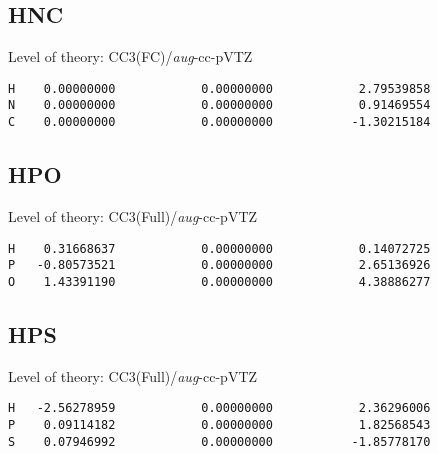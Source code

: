 \documentclass[journal=jctcce,manuscript=article,layout=traditional]{achemso}
\newcommand{\AVTZ}{\emph{aug}-cc-pVTZ}
\begin{document}

\subsection*{HNC}

\begin{singlespace}
Level of theory: CC3(FC)/{\AVTZ}
\begin{verbatim}
H    0.00000000            0.00000000            2.79539858
N    0.00000000            0.00000000            0.91469554
C    0.00000000            0.00000000           -1.30215184
\end{verbatim}
\end{singlespace}

\subsection*{HPO}

\begin{singlespace}
Level of theory: CC3(Full)/{\AVTZ}
\begin{verbatim}
H    0.31668637            0.00000000            0.14072725
P   -0.80573521            0.00000000            2.65136926
O    1.43391190            0.00000000            4.38886277
\end{verbatim}
\end{singlespace}

\subsection*{HPS}

\begin{singlespace}
Level of theory: CC3(Full)/{\AVTZ}
\begin{verbatim}
H   -2.56278959            0.00000000            2.36296006
P    0.09114182            0.00000000            1.82568543
S    0.07946992            0.00000000           -1.85778170
\end{verbatim}
\end{singlespace}
\end{document}

